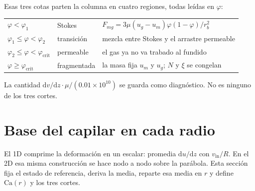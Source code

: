\documentclass[11pt,a4paper]{article}
\theoremstyle{plain}
\theoremstyle{definition}
\theoremstyle{remark}
\begin{document}
Esas tres cotas parten la columna en cuatro regiones, todas leídas en
\(\varphi\):

\begin{center}
\begin{tabular}{lll}
\(\varphi<\varphi_1\) & Stokes &
\(F_{mg}=3\mu(u_g-u_m)\varphi(1-\varphi)/r_b^2\) \\
\(\varphi_1\le\varphi<\varphi_2\) & transición &
mezcla entre Stokes y el arrastre permeable \\
\(\varphi_2\le\varphi<\varphi_{\mathrm{crit}}\) & permeable &
el gas ya no va trabado al fundido \\
\(\varphi\ge\varphi_{\mathrm{crit}}\) & fragmentada &
la masa fija \(u_m\) y \(u_g\); \(N\) y \(\xi\) se congelan
\end{tabular}
\end{center}

La cantidad \(\mathrm{d}v/\mathrm{d}z\cdot\mu/(0.01\times 10^{10})\) se
guarda como diagnóstico. No es ninguno de los tres cortes.

\section{Base del capilar en cada radio}

El 1D comprime la deformación en un escalar: promedia
\(\mathrm{d}u/\mathrm{d}z\) con \(v_{\mathrm{in}}/R\). En el 2D esa misma
construcción se hace nodo a nodo sobre la parábola. Esta sección fija el
estado de referencia, deriva la media, reparte esa media en \(r\) y define
\(\mathrm{Ca}(r)\) y los tres cortes.
\end{document}
